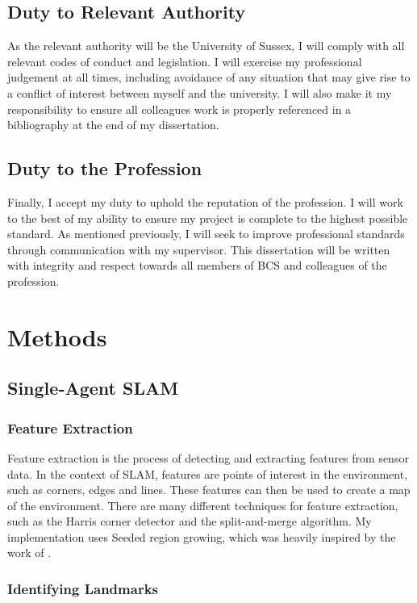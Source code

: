\documentclass[12pt]{article}
\begin{document}
\subsection{Duty to Relevant Authority}
As the relevant authority will be the University of Sussex, I will comply with all relevant codes of conduct and legislation. I
will exercise my professional judgement at all times, including avoidance of any situation that may give rise to a conflict of
interest between myself and the university. I will also make it my responsibility to ensure all colleagues work is properly
referenced in a bibliography at the end of my dissertation. \\
\subsection{Duty to the Profession}
Finally, I accept my duty to uphold the reputation of the profession. I will work to the best of my ability to ensure my project
is complete to the highest possible standard. As mentioned previously, I will seek to improve professional standards through
communication with my supervisor. This dissertation will be written with integrity and respect towards all members of BCS and colleagues
of the profession. \\



\section{Methods}

\subsection{Single-Agent SLAM}
\subsubsection{Feature Extraction}
Feature extraction is the process of detecting and extracting features from sensor data. In the context of SLAM, features
are points of interest in the environment, such as corners, edges and lines. These features can then be used to create a map
of the environment. There are many different techniques for feature extraction, such as the Harris corner detector and the
split-and-merge algorithm. My implementation uses Seeded region growing, which was heavily inspired by the work of
\cite{seeded_region_growing}.

\subsubsection{Identifying Landmarks}
\end{document}
